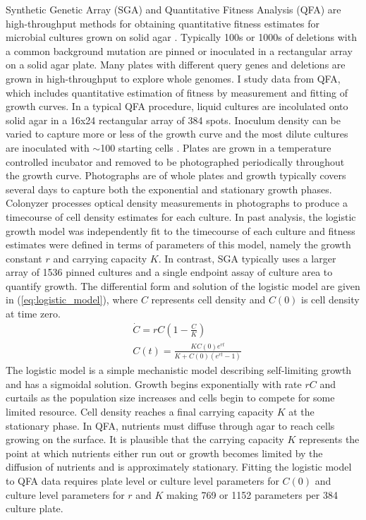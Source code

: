Synthetic Genetic Array (SGA) and Quantitative Fitness Analysis (QFA)
are high-throughput methods for obtaining quantitative fitness
estimates for microbial cultures grown on solid agar
\citep{Baryshnikova2010sga,Banks2012}. Typically 100s or 1000s of
deletions with a common background mutation are pinned or inoculated
in a rectangular array on a solid agar plate. Many plates with
different query genes and deletions are grown in high-throughput to
explore whole genomes. I study data from QFA, which includes
quantitative estimation of fitness by measurement and fitting of
growth curves. In a typical QFA procedure, liquid cultures are
incolulated onto solid agar in a 16x24 rectangular array of 384
spots. Inoculum density can be varied to capture more or less of the
growth curve and the most dilute cultures are inoculated with
\(\sim\)100 starting cells \citep{Addinall2011}. Plates are grown in a
temperature controlled incubator and removed to be photographed
periodically throughout the growth curve. Photographs are of whole
plates and growth typically covers several days to capture both the
exponential and stationary growth phases. Colonyzer
\citep{Lawless2010} processes optical density measurements in
photographs to produce a timecourse of cell density estimates for each
culture. In past analysis, the logistic growth model was independently
fit to the timecourse of each culture and fitness estimates were
defined in terms of parameters of this model, namely the growth
constant \(r\) and carrying capacity \(K\). In contrast, SGA typically
uses a larger array of 1536 pinned cultures and a single endpoint
assay of culture area to quantify growth. The differential form and
solution of the logistic model \citep{Verhulst1845} are given in
(\ref{eq:logistic_model}), where \(C\) represents cell density and
\(C(0)\) is cell density at time zero.
\begin{subequations}
  \label{eq:logistic_model}
  \begin{align}
    &\dot{C} = rC\left(1 - \frac{C}{K}\right)\\
    &C(t) = \frac{KC(0)e^{rt}}{K + C(0)(e^{rt}-1)}
  \end{align}
\end{subequations}
%
The logistic model is a simple mechanistic model describing
self-limiting growth and has a sigmoidal solution. Growth begins
exponentially with rate \(rC\) and curtails as the population size
increases and cells begin to compete for some limited resource. Cell
density reaches a final carrying capacity \(K\) at the stationary
phase. In QFA, nutrients must diffuse through agar to reach cells
growing on the surface. It is plausible that the carrying capacity
\(K\) represents the point at which nutrients either run out or growth
becomes limited by the diffusion of nutrients and is approximately
stationary. Fitting the logistic model to QFA data requires plate
level or culture level parameters for \(C(0)\) and culture level
parameters for \(r\) and \(K\) making 769 or 1152 parameters per 384
culture plate.


